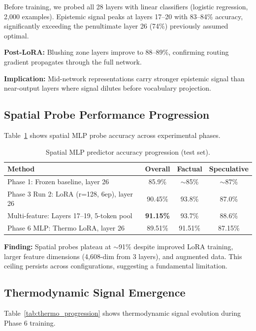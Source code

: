 \documentclass[11pt,a4paper]{article}
\begin{document}
Before training, we probed all 28 layers with linear classifiers (logistic regression, 2,000 examples). Epistemic signal peaks at layers 17--20 with 83--84\% accuracy, significantly exceeding the penultimate layer 26 (74\%) previously assumed optimal.

\textbf{Post-LoRA:} Blushing zone layers improve to 88--89\%, confirming routing gradient propagates through the full network.

\textbf{Implication:} Mid-network representations carry stronger epistemic signal than near-output layers where signal dilutes before vocabulary projection.

\subsection{Spatial Probe Performance Progression}

Table~\ref{tab:spatial} shows spatial MLP probe accuracy across experimental phases.

\begin{table}[h]
\centering
\caption{Spatial MLP predictor accuracy progression (test set).}
\label{tab:spatial}
\begin{tabular}{lccc}
\toprule
Method & Overall & Factual & Speculative \\
\midrule
Phase 1: Frozen baseline, layer 26 & 85.9\% & $\sim$85\% & $\sim$87\% \\
Phase 3 Run 2: LoRA (r=128, 6ep), layer 26 & 90.45\% & 93.8\% & 87.0\% \\
Multi-feature: Layers 17--19, 5-token pool & \textbf{91.15\%} & 93.7\% & 88.6\% \\
Phase 6 MLP: Thermo LoRA, layer 26 & 89.51\% & 91.51\% & 87.15\% \\
\bottomrule
\end{tabular}
\end{table}

\textbf{Finding:} Spatial probes plateau at $\sim$91\% despite improved LoRA training, larger feature dimensions (4,608-dim from 3 layers), and augmented data. This ceiling persists across configurations, suggesting a fundamental limitation.

\subsection{Thermodynamic Signal Emergence}

Table~\ref{tab:thermo_progression} shows thermodynamic signal evolution during Phase 6 training.
\end{document}
